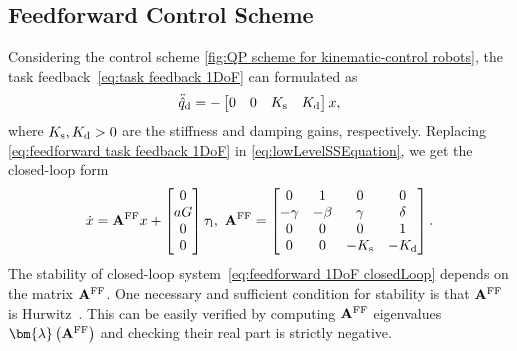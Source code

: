 \subsection{Feedforward Control Scheme}\label{subsec-chap2:feedforward control scheme}
Considering the control scheme \cref{fig:QP scheme for kinematic-control robots}, the task feedback~\eqref{eq:task feedback 1DoF} can formulated as 
\begin{equation}\label{eq:feedforward task feedback 1DoF}
	\ddot{\hat{q}}_{\rm d} = - \begin{bmatrix}
		0 & 0 & K_{\rm s} & K_{\rm d} 
	\end{bmatrix}x,  
\end{equation}
where $K_{\rm s}, K_{\rm d} >0 $ are the stiffness and damping gains, respectively. 
Replacing \cref{eq:feedforward task feedback 1DoF} in \cref{eq:lowLevelSSEquation}, we get the closed-loop form
\begin{equation}\label{eq:feedforward 1DoF closedLoop}
	\dot{x} = \mathbf{A}^{\rm FF}x + \begin{bmatrix}
		0 \\ aG \\ 0 \\ 0
	\end{bmatrix}\tau_{\rm l}, \ \mathbf{A}^{\rm FF} = 
	\begin{bmatrix}
		0 & 1 & 0 & 0 \\
		-\gamma & -\beta & \gamma & \delta \\ 
		0 & 0 & 0 & 1 \\ 
		0 & 0 & -K_{\rm s} & -K_{\rm d} 
	\end{bmatrix}.
\end{equation}
The stability of closed-loop system~\eqref{eq:feedforward 1DoF closedLoop} depends on the matrix $\mathbf{A}^{\rm FF}$. One necessary and sufficient condition for stability is that $\mathbf{A}^{\rm FF}$ is Hurwitz~\cite{khalil2002NonLinearSystems}. This can be easily verified by computing $\mathbf{A}^{\rm FF}$ eigenvalues $\bm{\lambda}\left(\mathbf{A}^{\rm FF}\right)$ and checking their real part is strictly negative. 

